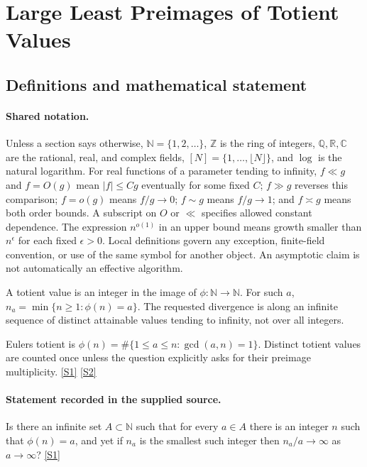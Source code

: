 \documentclass[11pt,a4paper]{article}
\newcommand{\N}{\mathbb{N}}
\newcommand{\Z}{\mathbb{Z}}
\newcommand{\Q}{\mathbb{Q}}
\newcommand{\R}{\mathbb{R}}
\newcommand{\C}{\mathbb{C}}
\newcommand{\sref}[2]{\hyperlink{source:#1:#2}{[S#2]}}
\begin{document}
\section{Large Least Preimages of Totient Values}\label{statement}


\subsection{Definitions and mathematical statement}

\paragraph{Shared notation.}Unless a section says otherwise, $\N=\{1,2,\ldots\}$,
$\Z$ is the ring of integers, $\Q,\R,\C$ are the rational, real, and complex
fields, $[N]=\{1,\ldots,\lfloor N\rfloor\}$, and $\log$ is the natural
logarithm. For real functions of a parameter tending to infinity,
$f\ll g$ and $f=O(g)$ mean $|f|\leq Cg$ eventually for some fixed $C$;
$f\gg g$ reverses this comparison; $f=o(g)$ means $f/g\to0$;
$f\sim g$ means $f/g\to1$; and $f\asymp g$ means both order bounds.
A subscript on $O$ or $\ll$ specifies allowed constant dependence.
The expression $n^{o(1)}$ in an upper bound means growth smaller than
$n^\epsilon$ for each fixed $\epsilon>0$. Local definitions govern any
exception, finite-field convention, or use of the same symbol for another
object. An asymptotic claim is not automatically an effective algorithm.



A totient value is an integer in the image of $\phi:\N\to\N$. For such $a$, $n_a=\min\{n\geq1:\phi(n)=a\}$. The requested divergence is along an infinite sequence of distinct attainable values tending to infinity, not over all integers.

Euler\textquotesingle s totient is $\phi(n)=\#\{1\leq a\leq n:\gcd(a,n)=1\}$. Distinct totient values are counted once unless the question explicitly asks for their preimage multiplicity. \sref{statement}{1} \sref{statement}{2}

\paragraph{Statement recorded in the supplied source.}
Is there an infinite set $A\subset \mathbb{N}$ such that for every $a\in A$ there is an integer $n$ such that $\phi(n)=a$, and yet if $n_a$ is the smallest such integer then $n_a/a\to \infty$ as $a\to\infty$? \sref{statement}{1}
\end{document}
